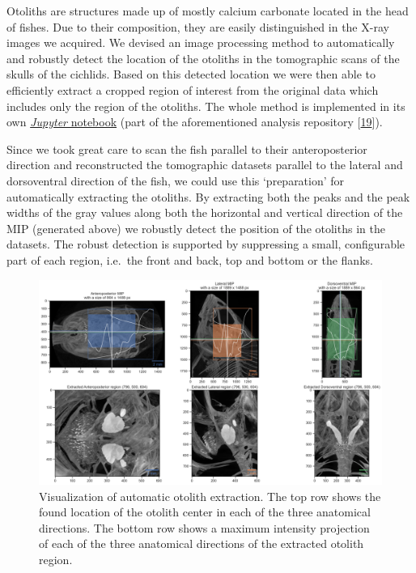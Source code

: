 Otoliths are structures made up of mostly calcium carbonate located in the head of fishes.
Due to their composition, they are easily distinguished in the X-ray images we acquired.
We devised an image processing method to automatically and robustly detect the location of the otoliths in the tomographic scans of the skulls of the cichlids.
Based on this detected location we were then able to efficiently extract a cropped region of interest from the original data which includes only the region of the otoliths.
The whole method is implemented in its own \href{https://github.com/habi/EAWAG/blob/master/ExtractOtoliths.ipynb}{\emph{Jupyter} notebook} (part of the aforementioned analysis repository {[}\protect\hyperlink{ref-1HteOscVd}{19}{]}).

Since we took great care to scan the fish parallel to their anteroposterior direction and reconstructed the tomographic datasets parallel to the lateral and dorsoventral direction of the fish, we could use this `preparation' for automatically extracting the otoliths.
By extracting both the peaks and the peak widths of the gray values along both the horizontal and vertical direction of the MIP (generated above) we robustly detect the position of the otoliths in the datasets.
The robust detection is supported by suppressing a small, configurable part of each region, i.e.~the front and back, top and bottom or the flanks.

\begin{figure}
\hypertarget{fig:otolithextraction}{%
\centering
\includegraphics{images/104016.head.rec.otolither.position.png}
\caption{Visualization of automatic otolith extraction.
The top row shows the found location of the otolith center in each of the three anatomical directions.
The bottom row shows a maximum intensity projection of each of the three anatomical directions of the extracted otolith region.}\label{fig:otolithextraction}
}
\end{figure}

